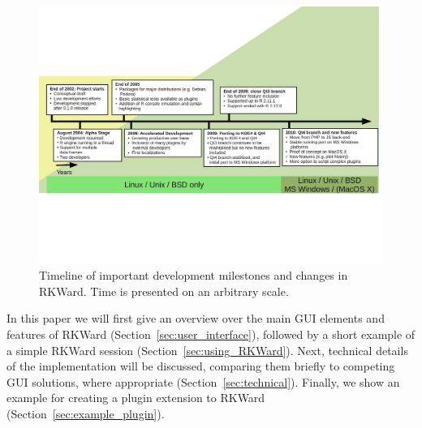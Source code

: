 \begin{figure}[htp]
 \centering
 \includegraphics[clip=true,trim=0cm 5.7cm 0cm 5.7cm,width=16cm]{../figures/timeline.pdf}
 \caption{Timeline of important development milestones and changes in RKWard.
          Time is presented on an arbitrary scale.}
 \label{fig:timeline}
\end{figure}

In this paper we will first give an overview over the main GUI elements and
features of RKWard (Section~\ref{sec:user_interface}), followed by a short example 
of a simple RKWard session (Section~\ref{sec:using_RKWard}). Next, technical 
details of the implementation will be discussed, comparing them briefly to 
competing GUI solutions, where appropriate (Section~\ref{sec:technical}).
Finally, we show an example for creating a plugin extension to RKWard 
(Section~\ref{sec:example_plugin}).
